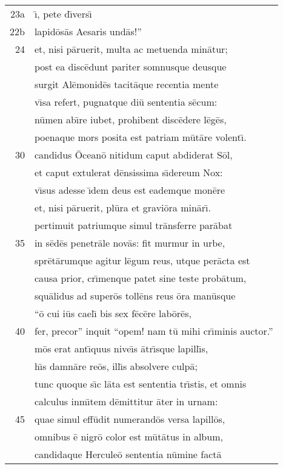 \documentclass[paper=6in:9in,pagesize=pdftex,
               headinclude=on,footinclude=on,12pt]{scrbook}
\begin{document}
\begin{longtable}[p]{ r l }
23a & \={\i}, pete d\={\i}vers\={\i}\\ 
22b & lapid\=os\=as Aesaris und\=as!''\\ 
24 & et, nisi p\=aruerit, multa ac metuenda min\=atur;\\ 
 & post ea disc\=edunt pariter somnusque deusque\\ 
 & surgit Al\=emonid\=es tacit\=aque recentia mente\\ 
 & v\={\i}sa refert, pugnatque di\=u sententia s\=ecum:\\ 
 & n\=umen ab\={\i}re iubet, prohibent disc\=edere l\=eg\=es,\\ 
 & poenaque mors posita est patriam m\=ut\=are volent\={\i}.\\ 
30 & candidus \=Ocean\=o nitidum caput abdiderat S\=ol,\\ 
 & et caput extulerat d\=ensissima s\={\i}dereum Nox:\\ 
 & v\={\i}sus adesse \={\i}dem deus est eademque mon\=ere\\ 
 & et, nisi p\=aruerit, pl\=ura et gravi\=ora min\=ar\={\i}.\\ 
 & pertimuit patriumque simul tr\=ansferre par\=abat\\ 
35 & in s\=ed\=es penetr\=ale nov\=as: fit murmur in urbe,\\ 
 & spr\=et\=arumque agitur l\=egum reus, utque per\=acta est\\ 
 & causa prior, cr\={\i}menque patet sine teste prob\=atum,\\ 
 & squ\=alidus ad super\=os toll\=ens reus \=ora man\=usque\\ 
 & ``\=o cui i\=us cael\={\i} bis sex f\=ec\=ere lab\=or\=es,\\ 
40 & fer, precor'' inquit ``opem! nam t\=u mihi cr\={\i}minis auctor.''\\ 
 & m\=os erat ant\={\i}quus nive\={\i}s \=atr\={\i}sque lapill\={\i}s,\\ 
 & h\={\i}s damn\=are re\=os, ill\={\i}s absolvere culp\=a;\\ 
 & tunc quoque s\={\i}c l\=ata est sententia tr\={\i}stis, et omnis\\ 
 & calculus inm\={\i}tem d\=emittitur \=ater in urnam:\\ 
45 & quae simul eff\=udit numerand\=os versa lapill\=os,\\ 
 & omnibus \=e nigr\=o color est m\=ut\=atus in album,\\ 
 & candidaque Hercule\=o sententia n\=umine fact\=a\\ 

\end{longtable}
\end{document}
